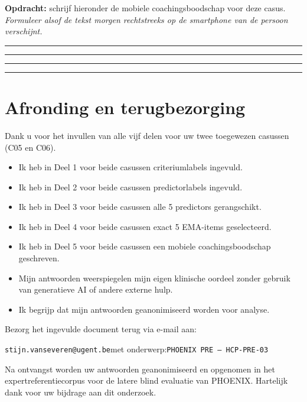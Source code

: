 \documentclass[11pt,a4paper]{article}
\newcommand{\writeline}{\vspace{0.22em}\noindent\rule{\linewidth}{0.25pt}\vspace{0.42em}\par}
\newcommand{\messagelines}{\writeline\writeline\writeline\writeline}
\begin{document}
\begin{responsebox}
\small\textbf{Opdracht:} schrijf hieronder de mobiele coachingsboodschap voor deze casus.
\textit{Formuleer alsof de tekst morgen rechtstreeks op de smartphone van de persoon verschijnt.}

\messagelines
\end{responsebox}

\vspace{0.6em}
\newpage


\section{Afronding en terugbezorging}

Dank u voor het invullen van alle vijf delen voor uw twee toegewezen casussen
(C05 en C06).

\begin{instrbox}[title=Checklist voor terugbezorging]
\begin{itemize}
\item[$\square$] Ik heb in Deel 1 voor beide casussen criteriumlabels ingevuld.
\item[$\square$] Ik heb in Deel 2 voor beide casussen predictorlabels ingevuld.
\item[$\square$] Ik heb in Deel 3 voor beide casussen alle 5 predictors gerangschikt.
\item[$\square$] Ik heb in Deel 4 voor beide casussen exact 5 EMA-items geselecteerd.
\item[$\square$] Ik heb in Deel 5 voor beide casussen een mobiele coachingsboodschap geschreven.
\item[$\square$] Mijn antwoorden weerspiegelen mijn eigen klinische oordeel zonder gebruik van generatieve AI of andere externe hulp.
\item[$\square$] Ik begrijp dat mijn antwoorden geanonimiseerd worden voor analyse.
\end{itemize}
\end{instrbox}

\medskip
Bezorg het ingevulde document terug via e-mail aan:
\begin{center}
\texttt{stijn.vanseveren@ugent.be}\quad met onderwerp:\quad \texttt{PHOENIX PRE --- HCP-PRE-03}
\end{center}

\vspace{0.5em}
\begin{tcolorbox}[colback=AccentBlue,colframe=PrimaryBlue,arc=2mm,boxrule=0.6pt,left=8pt,right=8pt,top=7pt,bottom=7pt]
\small\centering
Na ontvangst worden uw antwoorden geanonimiseerd en opgenomen in het expertreferentiecorpus
voor de latere blind evaluatie van PHOENIX. Hartelijk dank voor uw bijdrage aan dit onderzoek.
\end{tcolorbox}
\end{document}
